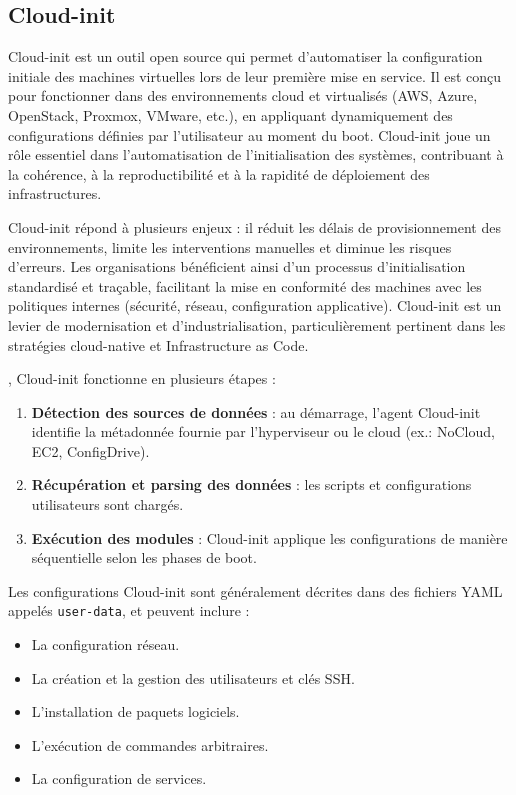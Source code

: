 \subsection{Cloud-init}

Cloud-init est un outil open source qui permet d’automatiser la configuration initiale des machines virtuelles lors de leur première mise en service. Il est conçu pour fonctionner dans des environnements cloud et virtualisés (AWS, Azure, OpenStack, Proxmox, VMware, etc.), en appliquant dynamiquement des configurations définies par l’utilisateur au moment du boot. Cloud-init joue un rôle essentiel dans l’automatisation de l’initialisation des systèmes, contribuant à la cohérence, à la reproductibilité et à la rapidité de déploiement des infrastructures.

 Cloud-init répond à plusieurs enjeux  : il réduit les délais de provisionnement des environnements, limite les interventions manuelles et diminue les risques d’erreurs. Les organisations bénéficient ainsi d’un processus d’initialisation standardisé et traçable, facilitant la mise en conformité des machines avec les politiques internes (sécurité, réseau, configuration applicative). Cloud-init est un levier de modernisation et d’industrialisation, particulièrement pertinent dans les stratégies cloud-native et Infrastructure as Code.

, Cloud-init fonctionne en plusieurs étapes :
\begin{enumerate}
	\item \textbf{Détection des sources de données}  : au démarrage, l’agent Cloud-init identifie la métadonnée fournie par l’hyperviseur ou le cloud (ex.: NoCloud, EC2, ConfigDrive).
	\item \textbf{Récupération et parsing des données}  : les scripts et configurations utilisateurs sont chargés.
	\item \textbf{Exécution des modules}  : Cloud-init applique les configurations de manière séquentielle selon les phases de boot.
\end{enumerate}

Les configurations Cloud-init sont généralement décrites dans des fichiers YAML appelés \texttt{user-data}, et peuvent inclure  :
\begin{itemize}
	\item La configuration réseau.
	\item La création et la gestion des utilisateurs et clés SSH.
	\item L’installation de paquets logiciels.
	\item L’exécution de commandes arbitraires.
	\item La configuration de services.
\end{itemize}

